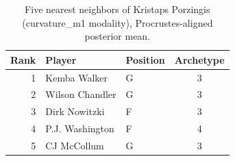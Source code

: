 \begin{table}[htbp]
  \centering\small
  \begin{tabular}{rllc}
    \toprule
    Rank & Player & Position & Archetype \\
    \midrule
    1 & Kemba Walker & G & 3 \\
    2 & Wilson Chandler & G & 3 \\
    3 & Dirk Nowitzki & F & 3 \\
    4 & P.J. Washington & F & 4 \\
    5 & CJ McCollum & G & 3 \\
    \bottomrule
  \end{tabular}
  \caption{Five nearest neighbors of Kristaps Porzingis (curvature_m1 modality), Procrustes-aligned posterior mean.}
  \label{tab:Kristaps_Porzingis_neighbors_curvature_m1}
\end{table}

